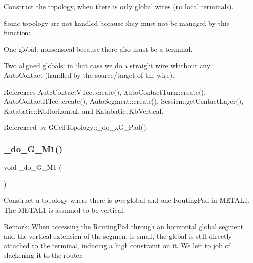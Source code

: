 Construct the topology, when there is only global wires (no local terminals).

Some topology are not handled because they must not be managed by this function\+: 
\begin{DoxyItemize}
\item One global\+: nonsensical because there also must be a terminal. 
\item Two aligned globals\+: in that case we do a straight wire whithout any Auto\+Contact (handled by the source/target of the wire). 
\end{DoxyItemize}

 

References Auto\+Contact\+V\+Tee\+::create(), Auto\+Contact\+Turn\+::create(), Auto\+Contact\+H\+Tee\+::create(), Auto\+Segment\+::create(), Session\+::get\+Contact\+Layer(), Katabatic\+::\+Kb\+Horizontal, and Katabatic\+::\+Kb\+Vertical.



Referenced by G\+Cell\+Topology\+::\+\_\+do\+\_\+x\+G\+\_\+Pad().

\mbox{\label{group__LoadGlobalRouting_gad24a03e87e269f16dcc28d8c2d9f1cfb}} 
\subsubsection{\texorpdfstring{\+\_\+do\+\_\+G\+\_\+M1()}{\_do\_1G\_1M1()}}
{\footnotesize\ttfamily void \+\_\+do\+\_\+G\+\_\+M1 (\begin{DoxyParamCaption}{ }\end{DoxyParamCaption})\hspace{0.3cm}{\ttfamily [private]}}

Construct a topology where there is {\itshape one} global and one Routing\+Pad in {\ttfamily M\+E\+T\+A\+L1}. The {\ttfamily M\+E\+T\+A\+L1} is assumed to be vertical.

\begin{DoxyParagraph}{Remark\+: When accessing the Routing\+Pad through an horizontal global segment}
and the vertical extension of the segment is small, the global is still directly attached to the terminal, inducing a high constraint on it. We left to job of slackening it to the router.
\end{DoxyParagraph}
 

